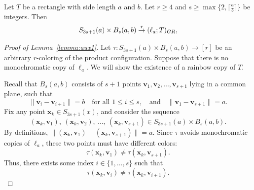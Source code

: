 \documentclass[10pt,a4paper]{amsart}
\newcommand{\ceil}[1]{\lceil #1\rceil}
\begin{document}
\begin{lemma}\label{lemma:aux1}
Let \(T\) be a rectangle with side length \(a\) and \(b\). Let \( r \ge 4 \) and \(s\ge \max \{2,\ceil{\frac{a}{b}}\}\) be integers. Then
\[
S_{3s+1}(a) \times B_{s}(a, b) \overset{r}{\rightarrow} (\ell_{a}; T)_{\textup{GR}},
\]
\end{lemma}

\begin{proof}[Proof of Lemma~\ref{lemma:aux1}]
Let \( \tau \colon S_{3s+1}(a) \times B_s(a, b) \to [r] \) be an arbitrary \(r\)-coloring of the product configuration. Suppose that there is no monochromatic copy of \(\ell_a\). We will show the existence of a rainbow copy of \(T\).

Recall that \( B_s(a, b) \) consists of \(s + 1\) points \(\boldsymbol{v}_1, \boldsymbol{v}_2, \ldots, \boldsymbol{v}_{s+1}\) lying in a common plane, such that
    \[
        \|\boldsymbol{v}_i - \boldsymbol{v}_{i+1}\| = b \quad \text{for all } 1 \le i \le s, \quad \text{and} \quad \|\boldsymbol{v}_1 - \boldsymbol{v}_{s+1}\| = a.
    \]
Fix any point \(\boldsymbol{x}_k \in S_{3s+1}(x)\), and consider the sequence
\[
(\boldsymbol{x}_k, \boldsymbol{v}_1),\ (\boldsymbol{x}_k, \boldsymbol{v}_2),\ \ldots,\ (\boldsymbol{x}_k, \boldsymbol{v}_{s+1})\in S_{3s+1}(a)\times B_{s}(a,b).
\]
By definitions, \(\|(\boldsymbol{x}_k, \boldsymbol{v}_1) - (\boldsymbol{x}_k, \boldsymbol{v}_{s+1})\| = a\). Since \(\tau\) avoids monochromatic copies of \(\ell_a\), these two points must have different colors:
\[
\tau(\boldsymbol{x}_k, \boldsymbol{v}_1) \ne \tau(\boldsymbol{x}_k, \boldsymbol{v}_{s+1}).
\]
Thus, there exists some index \(i \in \{1, \dots, s\}\) such that
\[
\tau(\boldsymbol{x}_k, \boldsymbol{v}_i) \ne \tau(\boldsymbol{x}_k, \boldsymbol{v}_{i+1}).
\]


\end{proof}
\end{document}
